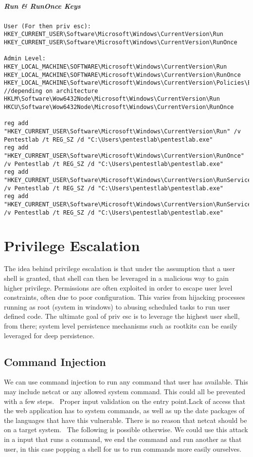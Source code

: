 \subparagraph{Run & RunOnce Keys}
\begin{lstlisting}[label=RegistryRun,caption=Registry Run Locations] 
User (For then priv esc):
HKEY_CURRENT_USER\Software\Microsoft\Windows\CurrentVersion\Run
HKEY_CURRENT_USER\Software\Microsoft\Windows\CurrentVersion\RunOnce

Admin Level:
HKEY_LOCAL_MACHINE\SOFTWARE\Microsoft\Windows\CurrentVersion\Run
HKEY_LOCAL_MACHINE\SOFTWARE\Microsoft\Windows\CurrentVersion\RunOnce
HKEY_LOCAL_MACHINE\Software\Microsoft\Windows\CurrentVersion\Policies\Explorer\Run
//depending on architecture
HKLM\Software\Wow6432Node\Microsoft\Windows\CurrentVersion\Run
HKCU\Software\Wow6432Node\Microsoft\Windows\CurrentVersion\RunOnce

reg add "HKEY_CURRENT_USER\Software\Microsoft\Windows\CurrentVersion\Run" /v Pentestlab /t REG_SZ /d "C:\Users\pentestlab\pentestlab.exe"
reg add "HKEY_CURRENT_USER\Software\Microsoft\Windows\CurrentVersion\RunOnce" /v Pentestlab /t REG_SZ /d "C:\Users\pentestlab\pentestlab.exe"
reg add "HKEY_CURRENT_USER\Software\Microsoft\Windows\CurrentVersion\RunServices" /v Pentestlab /t REG_SZ /d "C:\Users\pentestlab\pentestlab.exe"
reg add "HKEY_CURRENT_USER\Software\Microsoft\Windows\CurrentVersion\RunServicesOnce" /v Pentestlab /t REG_SZ /d "C:\Users\pentestlab\pentestlab.exe"

\end{lstlisting}

\citep{registryRun}

\section{Privilege Escalation}
The idea behind privilege escalation is that under the assumption that a user shell is granted, that shell can then be leveraged in a malicious way to gain higher privilege.
Permissions are often exploited in order to escape user level constraints, often due to poor configuration. This varies from hijacking processes running as root (system in windows) to
abusing scheduled tasks to run user defined code. The ultimate goal of priv esc is to leverage the highest user shell, from there; system level persistence mechanisms such as rootkits can be easily
leveraged for deep persistence. 

\subsection{Command Injection}
We can use command injection to run any command that user has available. This may include netcat or any allowed system command. This could all be prevented with a few steps. 
Proper input validation on the entry point.Lack of access that the web application has to system commands, as well as up the date packages of the languages that have this vulnerable. There is no reason that netcat should be on a target system. 
The following is possible otherwise. We could use this attack in a input that runs a command, we end the command and run another as that user, in this case popping a shell for us to run commands more easily ourselves.


